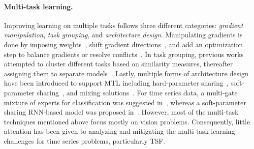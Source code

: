 \paragraph{Multi-task learning.} Improving learning on multiple tasks follows three different categories: \emph{gradient manipulation}, \emph{task grouping}, and \emph{architecture design}. Manipulating gradients is done by imposing weights~\cite{groenendijk2020multi}, shift gradient directions~\cite{yu2020gradient}, and add an optimization step to balance gradients or resolve conflicts~\cite{chen2018gradnorm, sener2018multi, liu2021conflict}. In task grouping, previous works attempted to cluster different tasks based on similarity measures, thereafter assigning them to separate models~\cite{zamir2018taskonomy, standley2020tasks, fifty2021efficiently, song2022efficient}. Lastly, multiple forms of architecture design have been introduced to support MTL including hard-parameter sharing~\cite{vandenhende2021multi}, soft-parameter sharing~\cite{misra2016cross, ishihara2021multi}, and mixing solutions~\cite{guangyuan2022recon}. For time series data, a multi-gate mixture of experts for classification was suggested in~\cite{ma2018modeling}, whereas a soft-parameter sharing RNN-based model was proposed in~\cite{chen2020multi}. However, most of the  multi-task techniques mentioned above focus mostly on vision problems. Consequently, little attention has been given to analyzing and mitigating the multi-task learning challenges for time series problems, particularly TSF.